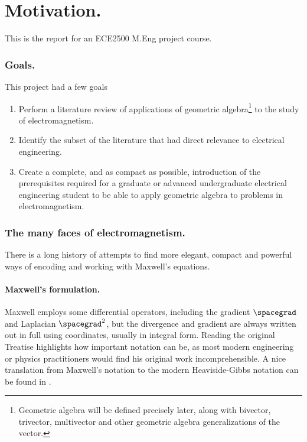 %
%
\section{Motivation.}
This is the report for an ECE2500 M.Eng project course.

\subsubsection{Goals.}
This project had a few goals
\begin{enumerate}
\item Perform a literature review of applications of geometric algebra\footnote{Geometric algebra will be defined precisely later, along with bivector, trivector, multivector and other geometric algebra generalizations of the vector.}
to the study of electromagnetism.
\item Identify the subset of the literature that had direct relevance to electrical engineering.
\item Create a complete, and as compact as possible, introduction of the prerequisites required
for a graduate or advanced undergraduate electrical engineering student to be able to apply
geometric algebra to problems in electromagnetism.
\end{enumerate}

\subsubsection{The many faces of electromagnetism.}

There is a long history of attempts to find more elegant, compact and powerful ways of encoding and working with Maxwell's equations.

\paragraph{Maxwell's formulation.}
Maxwell
\citep{maxwell1881treatiseVolumeI}
employs some differential operators, including the
gradient \( \spacegrad \) and Laplacian \( \spacegrad^2 \), but the divergence and gradient
are always written out in full using coordinates, usually in integral form.
Reading the original Treatise highlights how important notation can be, as
most modern engineering or physics practitioners would find his original work incomprehensible.
A nice translation from Maxwell's notation to the modern Heaviside-Gibbs notation can be found in
\citep{chappell2014geometricAppendixA}.

